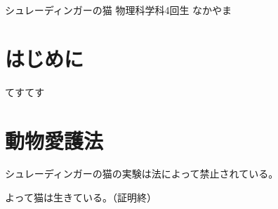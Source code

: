 \documentclass[11pt,b5paper,papersize,dvipdfmx]{jsbook}
\begin{document}
\kaishititle%
  {シュレーディンガーの猫}%
  {物理科学科4回生}%
  {なかやま}%


%
\section*{はじめに}
てすてす

\section{動物愛護法}
シュレーディンガーの猫の実験は法によって禁止されている。\par
よって猫は生きている。（証明終）
\end{document}
